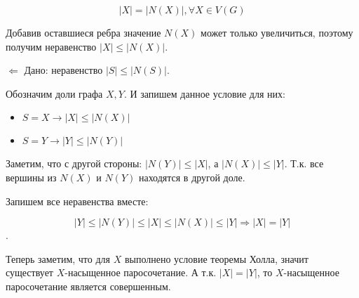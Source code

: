 \documentclass[fleqn]{article}
\begin{document}
\begin{enumerate}
	$$|X| = |N(X)|, \forall X \in V(G)$$ 
	
	Добавив оставшиеся ребра значение $N(X)$ может только увеличиться, поэтому получим неравенство $|X| \leqslant |N(X)|$.
	
	$\Leftarrow$ Дано: неравенство $|S| \leqslant |N(S)|$.
	
	Обозначим доли графа $X,Y$. И запишем данное условие для них:
	
	\begin{itemize}
		\item $S = X \rightarrow |X| \leqslant |N(X)|$
		\item $S = Y \rightarrow |Y| \leqslant |N(Y)|$
	\end{itemize}
	
	Заметим, что с другой стороны: $|N(Y)| \leqslant |X|$, а $|N(X)| \leqslant |Y|$. Т.к. все вершины из $N(X)$ и $N(Y)$ находятся в другой доле.
	
	Запишем все неравенства вместе:
	
	$$|Y| \leqslant |N(Y)| \leqslant |X| \leqslant |N(X)| \leqslant |Y| \Rightarrow |X| = |Y|$$.

	Теперь заметим, что для $X$ выполнено условие теоремы Холла, значит существует $X$-насыщенное паросочетание. А т.к. $|X| = |Y|$, то $X$-насыщенное паросочетание является совершенным.
	\end{enumerate}
	
	
\end{document}
